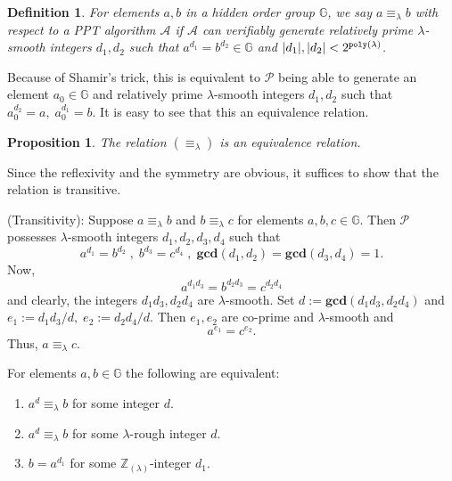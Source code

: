 \documentclass[11pt, lettersize, notitlepage, leqno, footskip=0.6cm]{article}
\newcommand{\bz}{\mathbb Z}
\newcommand{\bG}{\mathbb{G}}
\newcommand{\LRA}{\Longleftrightarrow}
\newcommand{\eqlam}{\equiv_{\lam}}
\newcommand{\wti}{\widetilde}
\newcommand{\mc}{\mathcal}
\newcommand{\mb}{\mathbb}
\newcommand{\mbf}{\mathbf}
\newcommand{\al}{\alpha}
\newcommand{\be}{\beta}
\newcommand{\lam}{\lambda}
\newcommand{\lamb}{\lambda}
\newcommand{\bzlam}{\bz_{(\lam)}}
\newcommand{\A}{\mc{A}}
\newcommand{\vs}{\vspace{-0.15cm}}
\newcommand{\noin}{\noindent}
\newcommand{\GCD}{\mbf{gcd}}
\newtheorem{Prop}[Thm]{Proposition}
\newtheorem{Def}{Definition}[section]
\numberwithin{equation}{section}
\begin{document}

\begin{Def} For elements $a, b$ in a hidden order group $\mb{G}$, we say $ a \equiv_{\lam} b$ with respect to a PPT algorithm $\A$ if $\mc{A}$ can verifiably generate relatively prime $\lamb$-smooth integers $d_1, d_2$ such that $a^{d_1} = b^{d_2} \in \bG$ and $|d_1|,|d_2| < 2^{\tt{poly}(\lam)}$. \end{Def}

\noindent Because of Shamir's trick, this is equivalent to $\mc{P}$ being able to generate an element $a_0\in \mb{G}$ and relatively prime $\lamb$-smooth integers $d_1, d_2$ such that $a_0^{d_2} = a, \; a_0^{d_1} = b.$ It is easy to see that this an equivalence relation.

\begin{Prop} The relation $(\equiv_{\lam})$ is an equivalence relation.\end{Prop}

\begin{prf} Since the reflexivity and the symmetry are obvious, it suffices to show that the relation is transitive.

\noindent (Transitivity): Suppose $a \equiv_{\lam} b$ and $b \equiv_{\lam} c$ for elements $a, b, c\in\mb{G}$. Then $\mc{P}$ possesses $\lam$-smooth integers $d_1,d_2, d_3, d_4$ such that \vs $$a^{d_1} = b^{d_2}\;,\; b^{d_3} = c^{d_4}\;,\;\GCD(d_1,d_2) = \GCD(d_3,d_4) = 1.$$ Now, \vs $$a^{d_1d_3} = b^{d_2d_3} = c^{d_2 d_4}$$ and clearly, the integers $d_1d_3, d_2 d_4$ are $\lam$-smooth. Set $d:= \GCD(d_1d_3, d_2 d_4)$ and $e_1:= d_1d_3/d,\; e_2:= d_2 d_4/d$. Then $e_1,e_2$ are co-prime and $\lam$-smooth and \vs $$ a^{e_1} = c^{e_2} .$$ Thus, $a \equiv_{\lam} c$.\end{prf}

For elements $a,b\in\mb{G}$ the following are equivalent:\begin{enumerate}[wide, labelwidth=!, labelindent=0pt] \vs

\item $a^d\eqlam b$ for some integer $d$.\vs
\item $a^d\eqlam b$ for some $\lam$-rough integer $d$.\vs
\item $b = a^{d_1}$ for some $\bzlam$-integer $d_1$.\end{enumerate}
\end{document}
